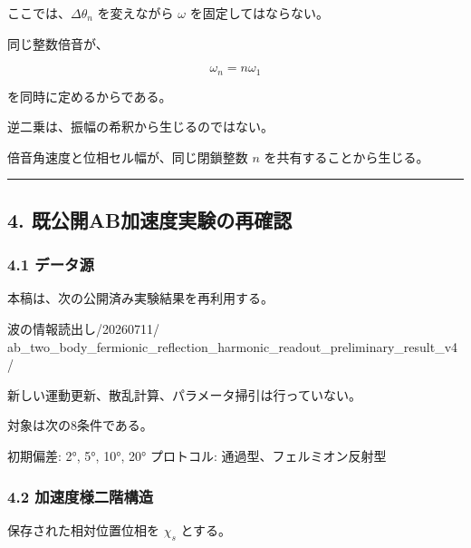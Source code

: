 \documentclass[
  a4paper,
]{ltjsarticle}
\newenvironment{Shaded}{}{}
\newcommand{\NormalTok}[1]{#1}
\begin{document}
ここでは、\(\Delta\theta_n\) を変えながら \(\omega\)
を固定してはならない。

同じ整数倍音が、

\[
\omega_n=n\omega_1
\]

を同時に定めるからである。

逆二乗は、振幅の希釈から生じるのではない。

倍音角速度と位相セル幅が、同じ閉鎖整数 \(n\) を共有することから生じる。

\begin{center}\rule{0.5\linewidth}{0.5pt}\end{center}

\subsection{4.
既公開AB加速度実験の再確認}\label{ux65e2ux516cux958babux52a0ux901fux5ea6ux5b9fux9a13ux306eux518dux78baux8a8d}

\subsubsection{4.1 データ源}\label{ux30c7ux30fcux30bfux6e90}

本稿は、次の公開済み実験結果を再利用する。

\begin{Shaded}
\begin{Highlighting}[]
\NormalTok{波の情報読出し/20260711/}
\NormalTok{ab\_two\_body\_fermionic\_reflection\_harmonic\_readout\_preliminary\_result\_v4/}
\end{Highlighting}
\end{Shaded}

新しい運動更新、散乱計算、パラメータ掃引は行っていない。

対象は次の8条件である。

\begin{Shaded}
\begin{Highlighting}[]
\NormalTok{初期偏差: 2°, 5°, 10°, 20°}
\NormalTok{プロトコル: 通過型、フェルミオン反射型}
\end{Highlighting}
\end{Shaded}

\subsubsection{4.2
加速度様二階構造}\label{ux52a0ux901fux5ea6ux69d8ux4e8cux968eux69cbux9020}

保存された相対位置位相を \(\chi_s\) とする。
\end{document}
